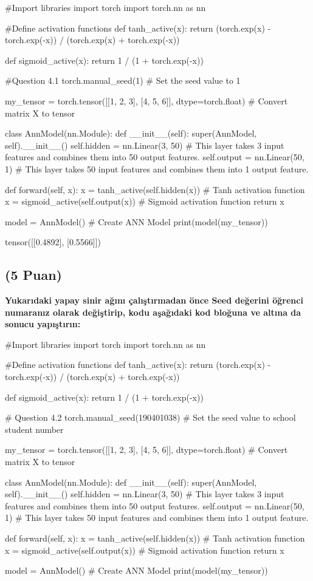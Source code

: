 \documentclass[11pt]{article}
\begin{document}
\begin{python}
#Import libraries
import torch
import torch.nn as nn

#Define activation functions
def tanh_active(x):
    return (torch.exp(x) - torch.exp(-x)) / (torch.exp(x) + torch.exp(-x))

def sigmoid_active(x):
    return 1 / (1 + torch.exp(-x))

#Question 4.1
torch.manual_seed(1)  # Set the seed value to 1

my_tensor = torch.tensor([[1, 2, 3], [4, 5, 6]], dtype=torch.float)  # Convert matrix X to tensor

class AnnModel(nn.Module):
    def __init__(self):
        super(AnnModel, self).__init__()
        self.hidden = nn.Linear(3, 50)  # This layer takes 3 input features and combines them into 50 output features.
        self.output = nn.Linear(50, 1)  # This layer takes 50 input features and combines them into 1 output feature.

    def forward(self, x):
        x = tanh_active(self.hidden(x))  # Tanh activation function
        x = sigmoid_active(self.output(x))  # Sigmoid activation function
        return x

model = AnnModel()  # Create ANN Model
print(model(my_tensor))
\end{python}

tensor([[0.4892],
        [0.5566]])
\subsection{(5 Puan)} \textbf{Yukarıdaki yapay sinir ağını çalıştırmadan önce Seed değerini öğrenci numaranız olarak değiştirip, kodu aşağıdaki kod bloğuna ve altına da sonucu yapıştırın:}

\begin{python}
#Import libraries
import torch
import torch.nn as nn

#Define activation functions
def tanh_active(x):
    return (torch.exp(x) - torch.exp(-x)) / (torch.exp(x) + torch.exp(-x))

def sigmoid_active(x):
    return 1 / (1 + torch.exp(-x))

# Question 4.2
torch.manual_seed(190401038)  # Set the seed value to school student number

my_tensor = torch.tensor([[1, 2, 3], [4, 5, 6]], dtype=torch.float)  # Convert matrix X to tensor

class AnnModel(nn.Module):
    def __init__(self):
        super(AnnModel, self).__init__()
        self.hidden = nn.Linear(3, 50)  # This layer takes 3 input features and combines them into 50 output features.
        self.output = nn.Linear(50, 1)  # This layer takes 50 input features and combines them into 1 output feature.

    def forward(self, x):
        x = tanh_active(self.hidden(x))  # Tanh activation function
        x = sigmoid_active(self.output(x))  # Sigmoid activation function
        return x

model = AnnModel()  # Create ANN Model
print(model(my_tensor))
\end{python}
\end{document}
